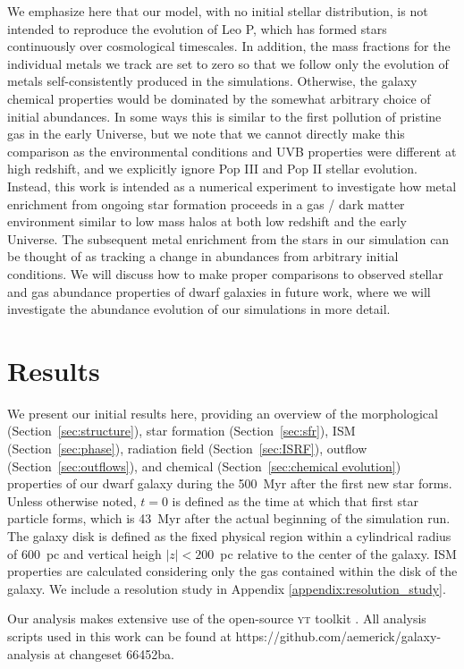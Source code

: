 \documentclass[twocolumn]{aastex61}
\begin{document}
We emphasize here that our model, with no initial stellar distribution, is not intended to reproduce the evolution of Leo P, which has formed stars continuously over cosmological timescales. In addition, the mass fractions for the individual metals we track are set to zero so that we follow only the evolution of metals self-consistently produced in the simulations. Otherwise, the galaxy chemical properties would be dominated by the somewhat arbitrary choice of initial abundances. In some ways this is similar to the first pollution of pristine gas in the early Universe, but we note that we cannot directly make this comparison as the environmental conditions and UVB properties were different at high redshift, and we explicitly ignore Pop III and Pop II stellar evolution. Instead, this work is intended as a numerical experiment to investigate how metal enrichment from ongoing star formation proceeds in a gas / dark matter environment similar to low mass halos at both low redshift and the early Universe. The subsequent metal enrichment from the stars in our simulation can be thought of as tracking 
a change in abundances from arbitrary initial conditions. We will discuss how to make proper comparisons to observed stellar and gas abundance properties of dwarf galaxies in future work, where we will investigate the abundance evolution of our simulations in more detail.

\section{Results}
\label{sec:results}
We present our initial results here, providing an overview of the morphological (Section~\ref{sec:structure}), star formation (Section~\ref{sec:sfr}), ISM (Section~\ref{sec:phase}), radiation field (Section~\ref{sec:ISRF}), outflow (Section~\ref{sec:outflows}), and chemical (Section~\ref{sec:chemical evolution}) properties of our dwarf galaxy during the 500~Myr after the first new star forms. Unless otherwise noted, $t = 0$ is defined as the time at which that first star particle forms, which is 43~Myr after the actual beginning of the simulation run. The galaxy disk is defined as the fixed physical region within a cylindrical radius of 600~pc and vertical heigh $|z| < 200$~pc relative to the center of the galaxy. ISM properties are calculated considering only the gas contained within the disk of the galaxy. We include a resolution study in Appendix \ref{appendix:resolution_study}.

Our analysis makes extensive use of the open-source \textsc{yt} toolkit \citep{yt}. All analysis scripts used in this work can be found at https://github.com/aemerick/galaxy-analysis at changeset 66452ba.
\end{document}
